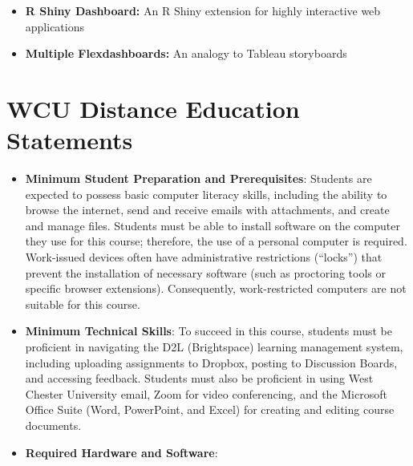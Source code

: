 \documentclass[
]{article}
\providecommand{\tightlist}{%
  \setlength{\itemsep}{0pt}\setlength{\parskip}{0pt}}
\begin{document}
\begin{itemize}
  \begin{itemize}
  \tightlist
  \item
    \textbf{R Shiny Dashboard:} An R Shiny extension for highly
    interactive web applications
  \item
    \textbf{Multiple Flexdashboards:} An analogy to Tableau storyboards
  \end{itemize}
\end{itemize}

\hypertarget{wcu-distance-education-statements}{%
\section{WCU Distance Education
Statements}\label{wcu-distance-education-statements}}

\begin{itemize}
\item
  \textbf{Minimum Student Preparation and Prerequisites}: Students are
  expected to possess basic computer literacy skills, including the
  ability to browse the internet, send and receive emails with
  attachments, and create and manage files. Students must be able to
  install software on the computer they use for this course; therefore,
  the use of a personal computer is required. Work-issued devices often
  have administrative restrictions (``locks'') that prevent the
  installation of necessary software (such as proctoring tools or
  specific browser extensions). Consequently, work-restricted computers
  are not suitable for this course.
\item
  \textbf{Minimum Technical Skills}: To succeed in this course, students
  must be proficient in navigating the D2L (Brightspace) learning
  management system, including uploading assignments to Dropbox, posting
  to Discussion Boards, and accessing feedback. Students must also be
  proficient in using West Chester University email, Zoom for video
  conferencing, and the Microsoft Office Suite (Word, PowerPoint, and
  Excel) for creating and editing course documents.
\item
  \textbf{Required Hardware and Software}:


\end{itemize}
\end{document}

